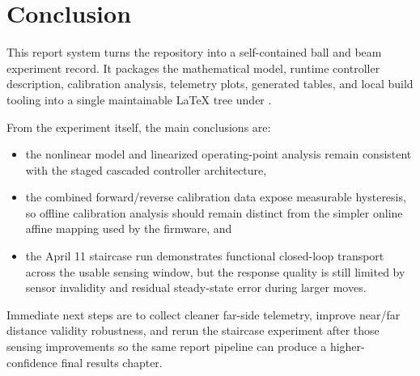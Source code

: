 \chapter{Conclusion}

This report system turns the repository into a self-contained ball and beam experiment
record. It packages the mathematical model, runtime controller description, calibration
analysis, telemetry plots, generated tables, and local build tooling into a single
maintainable LaTeX tree under .

From the experiment itself, the main conclusions are:

\begin{itemize}
  \item the nonlinear model and linearized operating-point analysis remain consistent
  with the staged cascaded controller architecture,
  \item the combined forward/reverse calibration data expose measurable hysteresis, so
  offline calibration analysis should remain distinct from the simpler online affine
  mapping used by the firmware, and
  \item the April 11 staircase run demonstrates functional closed-loop transport across
  the usable sensing window, but the response quality is still limited by sensor
  invalidity and residual steady-state error during larger moves.
\end{itemize}

Immediate next steps are to collect cleaner far-side telemetry, improve near/far
distance validity robustness, and rerun the staircase experiment after those sensing
improvements so the same report pipeline can produce a higher-confidence final results
chapter.
